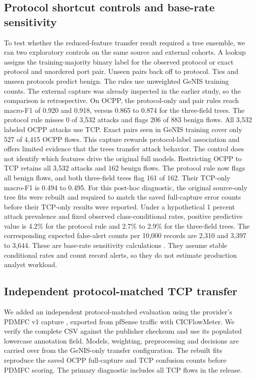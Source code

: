 \documentclass[journal,letterpaper]{IEEEtran}
\begin{document}
\subsection{Protocol shortcut controls and base-rate sensitivity}
To test whether the reduced-feature transfer result required a tree ensemble, we ran two exploratory controls on the same source and external cohorts. A lookup assigns the training-majority binary label for the observed protocol or exact protocol and unordered port pair. Unseen pairs back off to protocol. Ties and unseen protocols predict benign. The rules use unweighted GeNIS training counts. The external capture was already inspected in the earlier study, so the comparison is retrospective.
On OCPP, the protocol-only and pair rules reach macro-F1 of 0.920 and 0.918, versus 0.865 to 0.874 for the three-field trees. The protocol rule misses 0 of 3,532 attacks and flags 206 of 883 benign flows. All 3,532 labeled OCPP attacks use TCP. Exact pairs seen in GeNIS training cover only 527 of 4,415 OCPP flows. This capture rewards protocol-label association and offers limited evidence that the trees transfer attack behavior. The control does not identify which features drive the original full models.
Restricting OCPP to TCP retains all 3,532 attacks and 162 benign flows. The protocol rule now flags all benign flows, and both three-field trees flag 161 of 162. Their TCP-only macro-F1 is 0.494 to 0.495. For this post-hoc diagnostic, the original source-only tree fits were rebuilt and required to match the saved full-capture error counts before their TCP-only results were reported.
Under a hypothetical 1 percent attack prevalence and fixed observed class-conditional rates, positive predictive value is 4.2\% for the protocol rule and 2.7\% to 2.9\% for the three-field trees. The corresponding expected false-alert counts per 10,000 records are 2,310 and 3,397 to 3,644. These are base-rate sensitivity calculations \cite{ref38}. They assume stable conditional rates and count record alerts, so they do not estimate production analyst workload.
\subsection{Independent protocol-matched TCP transfer}
We added an independent protocol-matched evaluation using the provider's PDMFC v1 capture \cite{ref39}, exported from pfSense traffic with CICFlowMeter. We verify the complete CSV against the publisher checksum and use its populated lowercase annotation field. Models, weighting, preprocessing and decisions are carried over from the GeNIS-only transfer configuration. The rebuilt fits reproduce the saved OCPP full-capture and TCP confusion counts before PDMFC scoring. The primary diagnostic includes all TCP flows in the release.
\end{document}
